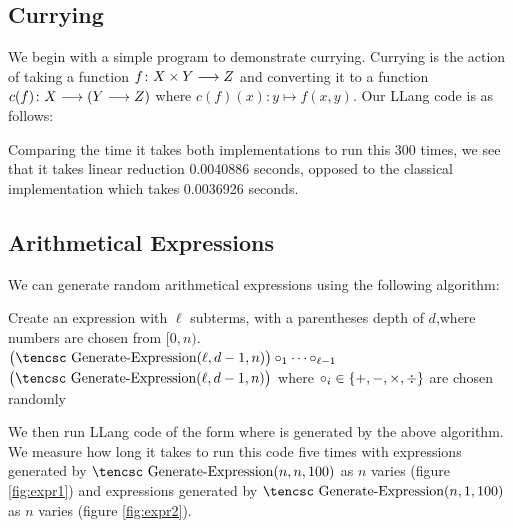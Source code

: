 \documentclass{llncs}
\newcounter{algo}
\begin{document}
\subsection{Currying}

We begin with a simple program to demonstrate currying.
Currying is the action of taking a function $f\colon X\times Y\longrightarrow Z$ and converting it to a function $c(f)\colon X\longrightarrow(Y\longrightarrow Z)$ where $c(f)(x)\colon y\mapsto f(x,y)$.
Our LLang code is as follows:



Comparing the time it takes both implementations to run this 300 times, we see that it takes linear reduction 0.0040886 seconds, opposed to the classical implementation which takes 0.0036926 seconds.

\subsection{Arithmetical Expressions}

We can generate random arithmetical expressions using the following algorithm:

\medskip
\algorithm
\Comment Create an expression with $\ell$ subterms, with a parentheses depth of $d$,\cr where numbers are chosen from $[0,n)$.\EndComment
{}
     \vtop{\hsize=.8\hsize
        \noindent \Return an expression with $\ell$ randomly chosen numbers in\hfil\break $[0,n)$ and $\ell-1$ random operators in $\set{+,-,\times,\div}$.}
    \State \Return $\bigl(\hbox{\tencsc Generate-Expression}(\ell,d-1,n)\bigr)\circ_1\cdots\circ_{\ell-1}$
    \nonum\State \hfill$\bigl(\hbox{\tencsc Generate-Expression}(\ell,d-1,n)\bigr)$
    \nonum\State where $\circ_i\in\set{+,-,\times,\div}$ are chosen randomly
\EndFunc
\ealgorithm
\medskip

\noindent We then run LLang code of the form  where  is generated by the above algorithm.
We measure how long it takes to run this code five times with expressions generated by $\hbox{\tencsc Generate-Expression}(n,n,100)$ as $n$ varies (figure \ref{fig:expr1}) and
expressions generated by $\hbox{\tencsc Generate-Expression}(n,1,100)$ as $n$ varies (figure \ref{fig:expr2}).
\end{document}
